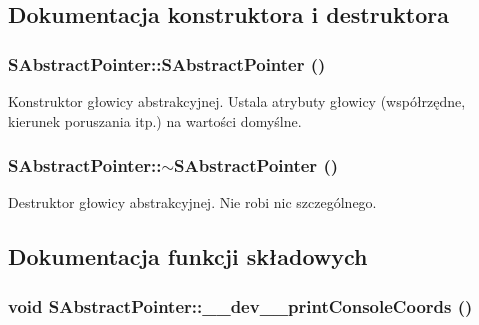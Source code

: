 \subsection{Dokumentacja konstruktora i destruktora}
\hypertarget{classSAbstractPointer_9281c3dba0da68460fa87bd17bd768b4}{
\subsubsection[{SAbstractPointer}]{\setlength{\rightskip}{0pt plus 5cm}SAbstractPointer::SAbstractPointer ()}}
\label{classSAbstractPointer_9281c3dba0da68460fa87bd17bd768b4}


Konstruktor głowicy abstrakcyjnej. Ustala atrybuty głowicy (współrzędne, kierunek poruszania itp.) na wartości domyślne. \hypertarget{classSAbstractPointer_9973354ecf610b3d48170dd70f0b22ce}{
\subsubsection[{$\sim$SAbstractPointer}]{\setlength{\rightskip}{0pt plus 5cm}SAbstractPointer::$\sim$SAbstractPointer ()}}
\label{classSAbstractPointer_9973354ecf610b3d48170dd70f0b22ce}


Destruktor głowicy abstrakcyjnej. Nie robi nic szczególnego. 

\subsection{Dokumentacja funkcji składowych}
\hypertarget{classSAbstractPointer_3faa92c6a0de5ea971a7d32ceb51980f}{
\subsubsection[{\_\-\_\-dev\_\-\_\-printConsoleCoords}]{\setlength{\rightskip}{0pt plus 5cm}void SAbstractPointer::\_\-\_\-dev\_\-\_\-printConsoleCoords ()}}
\label{classSAbstractPointer_3faa92c6a0de5ea971a7d32ceb51980f}


